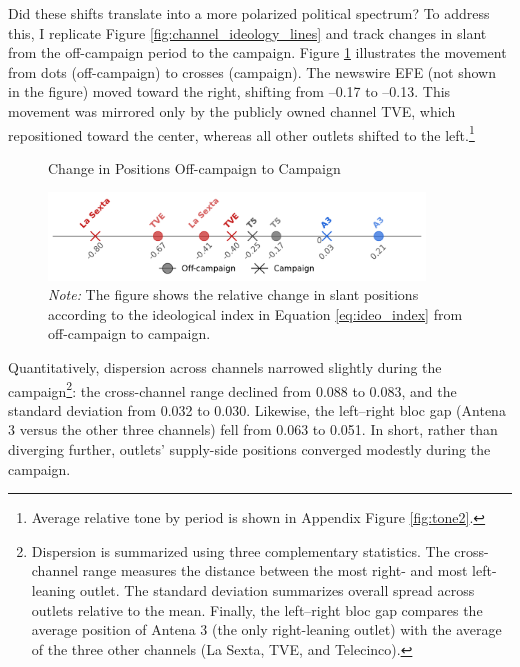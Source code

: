 \documentclass[12pt]{article}
\begin{document}
  Did these shifts translate into a more polarized political spectrum? To address this, I replicate Figure \ref{fig:channel_ideology_lines} and track changes in slant from the off-campaign period to the campaign. Figure \ref{fig:change_line} illustrates the movement from dots (off-campaign) to crosses (campaign). The newswire EFE (not shown in the figure) moved toward the right, shifting from –0.17 to –0.13. This movement was mirrored only by the publicly owned channel TVE, which repositioned toward the center, whereas all other outlets shifted to the left.\footnote{Average relative tone by period is shown in Appendix Figure \ref{fig:tone2}.}


	\begin{figure}[!htb]
		\centering
		\caption{Change in Positions Off-campaign to Campaign}
		\includegraphics[width=100mm]{figures/congress_line_chatgpt_pre_postv2}
		
		\caption*{\small \textit{Note:} The figure shows the relative change in  slant positions  according to the ideological index in Equation \ref{eq:ideo_index} from off-campaign to campaign. }%
		\label{fig:change_line}
	\end{figure}
	
	
Quantitatively, dispersion across channels narrowed slightly during the campaign\footnote{Dispersion is summarized using three complementary statistics. The cross-channel range measures the distance between the most right- and most left-leaning outlet. The standard deviation summarizes overall spread across outlets relative to the mean. Finally, the left–right bloc gap compares the average position of Antena 3 (the only right-leaning outlet) with the average of the three other channels (La Sexta, TVE, and Telecinco).}: the cross-channel range declined from 0.088 to 0.083, and the standard deviation from 0.032 to 0.030. Likewise, the left–right bloc gap (Antena 3 versus the other three channels) fell from 0.063 to 0.051. In short, rather than diverging further, outlets’ supply-side positions converged modestly during the campaign.
	

	
	
\end{document}

